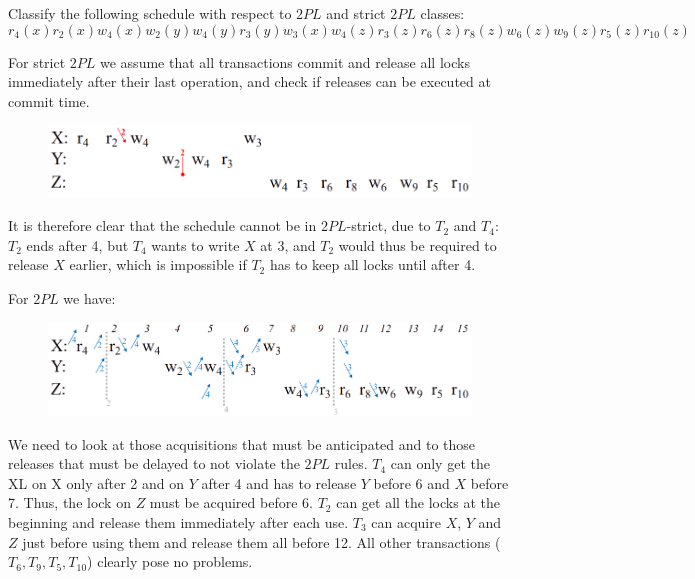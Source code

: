 \documentclass[12pt, a4paper]{report}
\newtheorem[style=M,bodystyle=\normalfont]{theorem}{Theorem}
\newtheorem[style=M,bodystyle=\normalfont]{corollary}{Corollary}
\newtheorem[style=M,bodystyle=\normalfont]{lemma}{Lemma}
\newtheorem[style=M,bodystyle=\normalfont]{definition}{Definition}
\begin{document}
    \newpage

    \begin{Exercise}[label=8]
        Classify the following schedule with respect to $2PL$ and strict $2PL$ classes: 
        \[r_4(x) r_2(x) w_4(x) w_2(y) w_4(y) r_3(y) w_3(x) w_4(z) r_3(z) r_6(z) r_8(z) w_6(z) w_9(z) r_5(z) r_10(z)\]
    \end{Exercise}
    \begin{Answer}[ref=8]
        For strict $2PL$ we assume that all transactions commit and release all locks immediately after their last operation, and check if releases can be executed at commit time.
        \begin{figure}[H]
            \centering
            \includegraphics[width=1\linewidth]{images/2PL3.png}
        \end{figure}
        It is therefore clear that the schedule cannot be in $2PL$-strict, due to $T_2$ and $T_4$: $T_2$ ends after 4, but $T_4$ wants to write $X$ at 3, and $T_2$ would thus be 
        required to release $X$ earlier, which is impossible if $T_2$ has to keep all locks until after 4.

        For $2PL$ we have: 
        \begin{figure}[H]
            \centering
            \includegraphics[width=1\linewidth]{images/2PL4.png}
        \end{figure}
        We need to look at those acquisitions that must be anticipated and to those releases that must be delayed to not violate the $2PL$ rules.
        $T_4$ can only get the XL on X only after 2 and on $Y$ after 4 and has to release $Y$ before 6 and $X$ before 7. Thus, the lock on $Z$ must be acquired before 6.
        $T_2$ can get all the locks at the beginning and release them immediately after each use. $T_3$ can acquire $X$, $Y$ and $Z$ just before using them and release them all before 12. 
        All other transactions ($T_6, T_9, T_5, T_10$) clearly pose no problems.
    \end{Answer}
\end{document}
